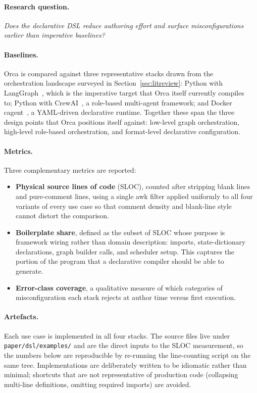 \documentclass[sigconf,nonacm]{acmart}
\begin{document}
\paragraph{Research question.} \emph{Does the declarative DSL reduce
authoring effort and surface misconfigurations earlier than imperative
baselines?}

\paragraph{Baselines.} Orca is compared against three representative stacks
drawn from the orchestration landscape surveyed in
Section~\ref{sec:litreview}: Python with
LangGraph~\cite{langgraph2024}, which is the imperative target that Orca
itself currently compiles to; Python with CrewAI~\cite{crewai2024}, a
role-based multi-agent framework; and Docker
cagent~\cite{docker2025cagent}, a YAML-driven declarative runtime.
Together these span the three design points that Orca positions itself
against: low-level graph orchestration, high-level role-based
orchestration, and format-level declarative configuration.

\paragraph{Metrics.} Three complementary metrics are reported:
\begin{itemize}[leftmargin=*]
  \item \textbf{Physical source lines of code} (SLOC), counted after
        stripping blank lines and pure-comment lines, using a single awk
        filter applied uniformly to all four variants of every use case so
        that comment density and blank-line style cannot distort the
        comparison.
  \item \textbf{Boilerplate share}, defined as the subset of SLOC whose
        purpose is framework wiring rather than domain description:
        imports, state-dictionary declarations, graph builder calls, and
        scheduler setup. This captures the portion of the program that a
        declarative compiler should be able to generate.
  \item \textbf{Error-class coverage}, a qualitative measure of which
        categories of misconfiguration each stack rejects at author time
        versus first execution.
\end{itemize}

\paragraph{Artefacts.} Each use case is implemented in all four stacks.
The source files live under \texttt{paper/dsl/examples/} and are the
direct inputs to the SLOC measurement, so the numbers below are
reproducible by re-running the line-counting script on the same tree.
Implementations are deliberately written to be idiomatic rather than
minimal; shortcuts that are not representative of production code
(collapsing multi-line definitions, omitting required imports) are
avoided.
\end{document}
